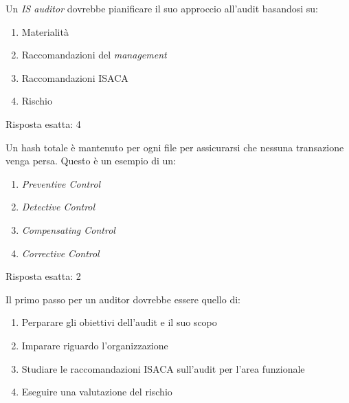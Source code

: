 \begin{Exercise} [
  title={Quiz},
  label={audit3}
  ]

  \Question Un \textit{IS auditor} dovrebbe pianificare il suo approccio 
all'audit basandosi su:
\begin{enumerate}
 \item Materialità
 \item Raccomandazioni del \textit{management}
 \item Raccomandazioni ISACA
 \item Rischio
\end{enumerate}
  
\end{Exercise}


\begin{Answer} [
  ref={audit3},
  number={3}
  ]

  \Question Risposta esatta: 4

\end{Answer}

\begin{Exercise} [
  title={Quiz},
  label={audit4}
  ]

  \Question Un hash totale è mantenuto per ogni file per assicurarsi che 
nessuna transazione venga persa. Questo è un esempio di un:
\begin{enumerate}
 \item \textit{Preventive Control}
 \item \textit{Detective Control}
 \item \textit{Compensating Control}
 \item \textit{Corrective Control}
\end{enumerate}

\end{Exercise}


\begin{Answer} [
  ref={audit4},
  number={4}
  ]

  \Question Risposta esatta: 2

\end{Answer}

\begin{Exercise} [
  title={Quiz},
  label={audit5}
  ]

  \Question Il primo passo per un auditor dovrebbe essere quello di:
  \begin{enumerate}
   \item Perparare gli obiettivi dell'audit e il suo scopo
   \item Imparare riguardo l'organizzazione
   \item Studiare le raccomandazioni ISACA sull'audit per l'area funzionale
   \item Eseguire una valutazione del rischio
  \end{enumerate}

\end{Exercise}


